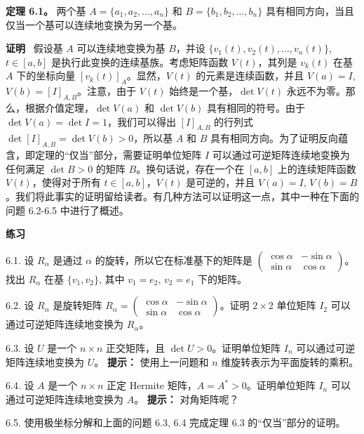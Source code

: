 \textbf{定理 6.1。} 两个基 $A = \{a_1, a_2, \dots, a_n\}$ 和 $B = \{b_1, b_2, \dots, b_n\}$ 具有相同方向，当且仅当一个基可以连续地变换为另一个基。

\textbf{证明}~ 假设基 $A$ 可以连续地变换为基 $B$，并设 $\{v_1(t), v_2(t), \dots, v_n(t)\}$, $t \in [a, b]$ 是执行此变换的连续基族。考虑矩阵函数 $V(t)$，其列是 $v_k(t)$ 在基 $A$ 下的坐标向量 $[v_k(t)]_A$。显然，$V(t)$ 的元素是连续函数，并且 $V(a) = I$, $V(b) = [I]_{A,B}$。注意，由于 $V(t)$ 始终是一个基，$\det V(t)$ 永远不为零。那么，根据介值定理，$\det V(a)$ 和 $\det V(b)$ 具有相同的符号。由于 $\det V(a) = \det I = 1$，我们可以得出 $[I]_{A,B}$ 的行列式 $\det[I]_{A,B} = \det V(b) > 0$，所以基 $A$ 和 $B$ 具有相同方向。为了证明反向蕴含，即定理的“仅当”部分，需要证明单位矩阵 $I$ 可以通过可逆矩阵连续地变换为任何满足 $\det B > 0$ 的矩阵 $B$。换句话说，存在一个在 $[a, b]$ 上的连续矩阵函数 $V(t)$，使得对于所有 $t \in [a, b]$，$V(t)$ 是可逆的，并且 $V(a) = I$, $V(b) = B$。我们将此事实的证明留给读者。有几种方法可以证明这一点，其中一种在下面的问题 6.2-6.5 中进行了概述。

\textbf{练习}~

6.1. 设 $R_\alpha$ 是通过 $\alpha$ 的旋转，所以它在标准基下的矩阵是 $\begin{pmatrix} \cos \alpha & -\sin \alpha \\ \sin \alpha & \cos \alpha \end{pmatrix}$。找出 $R_\alpha$ 在基 $\{v_1, v_2\}$, 其中 $v_1 = e_2$, $v_2 = e_1$ 下的矩阵。

6.2. 设 $R_\alpha$ 是旋转矩阵 $R_\alpha = \begin{pmatrix} \cos \alpha & -\sin \alpha \\ \sin \alpha & \cos \alpha \end{pmatrix}$。证明 $2 \times 2$ 单位矩阵 $I_2$ 可以通过可逆矩阵连续地变换为 $R_\alpha$。

6.3. 设 $U$ 是一个 $n \times n$ 正交矩阵，且 $\det U > 0$。证明单位矩阵 $I_n$ 可以通过可逆矩阵连续地变换为 $U$。
\textbf{提示：} 使用上一问题和 $n$ 维旋转表示为平面旋转的乘积。

6.4. 设 $A$ 是一个 $n \times n$ 正定 Hermite 矩阵，$A = A^* > 0$。证明单位矩阵 $I_n$ 可以通过可逆矩阵连续地变换为 $A$。
\textbf{提示：} 对角矩阵呢？

6.5. 使用极坐标分解和上面的问题 6.3, 6.4 完成定理 6.3 的“仅当”部分的证明。
